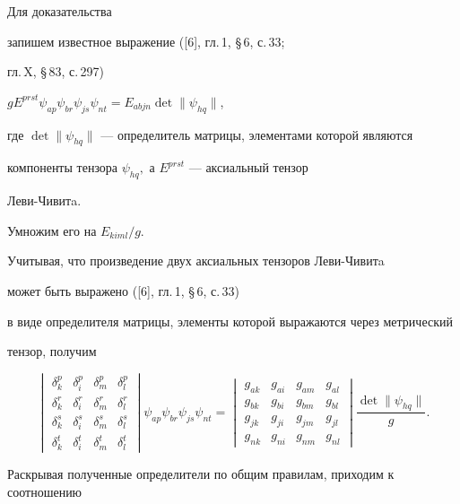 Для доказательства


запишем известное выражение ([6], гл.\,1, \S\,6, с.\,33;


гл.\,X, \S\,83, с.\,297)


$gE^{prst}\psi_{ap}\psi_{br}\psi_{js}\psi_{nt}=E_{abjn}\det\|\psi_{hq}\|$,


где $\det\|\psi_{hq}\|$ --- определитель матрицы, элементами которой являются


компоненты тензора $\psi_{hq},$ а $E^{prst}$ --- аксиальный тензор


Леви-Чивитa.


Умножим его на $E_{kiml}/g.$


Учитывая, что произведение двух аксиальных тензоров Леви-Чивитa


может быть выражено ([6], гл.\,1, \S\,6, с.\,33)


в виде определителя матрицы, элементы которой выражаются через метрический


тензор, получим


$$


\begin{vmatrix}


\delta_k^p&\delta_i^p&\delta_m^p&\delta_l^p\\


\delta_k^r&\delta_i^r&\delta_m^r&\delta_l^r\\


\delta_k^s&\delta_i^s&\delta_m^s&\delta_l^s\\


\delta_k^t&\delta_i^t&\delta_m^t&\delta_l^t


\end{vmatrix}


\psi_{ap}\psi_{br}\psi_{js}\psi_{nt}=


\begin{vmatrix}


g_{ak}&g_{ai}&g_{am}&g_{al}\\


g_{bk}&g_{bi}&g_{bm}&g_{bl}\\


g_{jk}&g_{ji}&g_{jm}&g_{jl}\\


g_{nk}&g_{ni}&g_{nm}&g_{nl}


\end{vmatrix}


\frac{\det\|\psi_{hq}\|}{g}.


$$


Раскрывая полученные определители по общим правилам, приходим к соотношению


